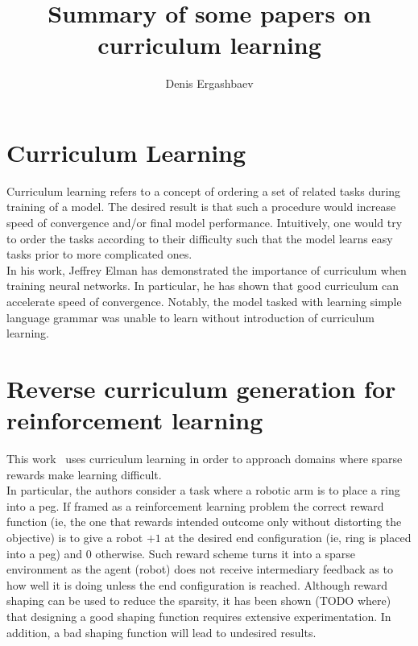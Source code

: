 \documentclass{article}
\title{Summary of some papers on curriculum learning}
\author{Denis Ergashbaev}
\begin{document}
\maketitle

\section{Curriculum Learning}

Curriculum learning refers to a concept of ordering a set of related tasks during training of a model. The desired result is that such a procedure would increase speed of convergence and/or final model performance. Intuitively, one would try to order the tasks according to their difficulty such that the model learns easy tasks prior to more complicated ones.\\

In his work\cite{elman1993learning}, Jeffrey Elman has demonstrated the importance of curriculum when training neural networks. In particular, he has shown that good curriculum can accelerate speed of convergence. Notably, the model tasked with learning simple language grammar was unable to learn without introduction of curriculum learning. 

\section{Reverse curriculum generation for reinforcement learning~\cite{florensa2017reverse}}
This work~\cite{florensa2017reverse} uses curriculum learning in order to approach domains where sparse rewards make learning difficult.\\

In particular, the authors consider a task where a robotic arm is to place a ring into a peg. If framed as a reinforcement learning problem the correct reward function (ie, the one that rewards intended outcome only without distorting the objective) is to give a robot $+1$ at the desired end configuration (ie, ring is placed into a peg) and $0$ otherwise. Such reward scheme turns it into a sparse environment as the agent (robot) does not receive intermediary feedback as to how well it is doing unless the end configuration is reached. Although reward shaping can be used to reduce the sparsity, it has been shown (TODO where) that designing a good shaping function requires extensive experimentation. In addition, a bad shaping function will lead to undesired results.




\end{document}
